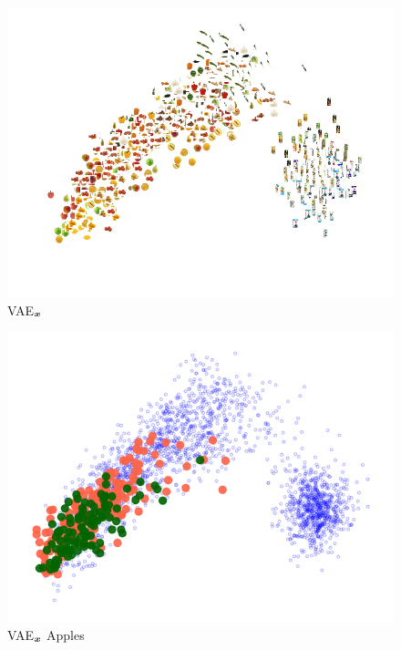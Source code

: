
	\begin{subfigure}[b]{0.3\textwidth}
	\centering
	\includegraphics[width=\textwidth]{Chapter1/pics_paperB/pca_latents_vae_seed2}
	\caption{VAE$_{{\bm{x}}}$}
	\label{fig:pca_latents_vae}
\end{subfigure}
\hfill
\begin{subfigure}[b]{0.3\textwidth}
	\centering
	\includegraphics[width=\textwidth]{Chapter1/pics_paperB/pca_latents_apples_vae_seed2}
	\caption{VAE$_{{\bm{x}}}$ Apples}
	\label{fig:pca_latents_vae_apples}
\end{subfigure}
\hfill
